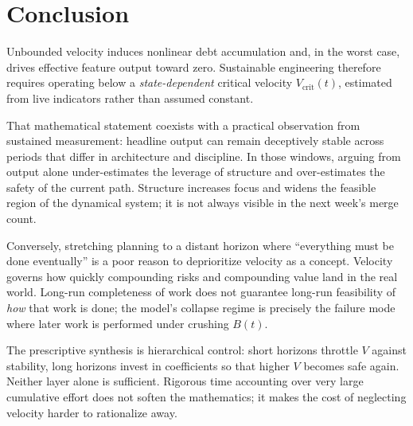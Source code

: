 \documentclass[11pt]{article}
\begin{document}
\section{Conclusion}

Unbounded velocity induces nonlinear debt accumulation and, in the worst case, drives effective feature output toward zero. Sustainable engineering therefore requires operating below a \emph{state-dependent} critical velocity $V_{\text{crit}}(t)$, estimated from live indicators rather than assumed constant.

That mathematical statement coexists with a practical observation from sustained measurement: headline output can remain deceptively stable across periods that differ in architecture and discipline. In those windows, arguing from output alone under-estimates the leverage of structure and over-estimates the safety of the current path. Structure increases focus and widens the feasible region of the dynamical system; it is not always visible in the next week's merge count.

Conversely, stretching planning to a distant horizon where ``everything must be done eventually'' is a poor reason to deprioritize velocity as a concept. Velocity governs how quickly compounding risks and compounding value land in the real world. Long-run completeness of work does not guarantee long-run feasibility of \emph{how} that work is done; the model's collapse regime is precisely the failure mode where later work is performed under crushing $B(t)$.

The prescriptive synthesis is hierarchical control: short horizons throttle $V$ against stability, long horizons invest in coefficients so that higher $V$ becomes safe again. Neither layer alone is sufficient. Rigorous time accounting over very large cumulative effort does not soften the mathematics; it makes the cost of neglecting velocity harder to rationalize away.
\end{document}
